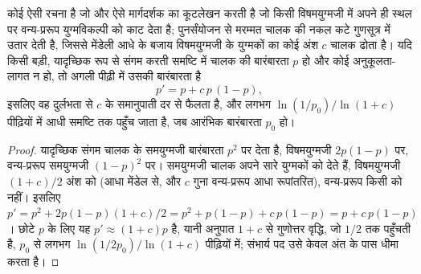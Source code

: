 \begin{theorem}[किसी जीन-चालक का अति-मेंडेली फैलाव]\label{thm:b3:genetic-engineering:drive}
कोई \emph{} ऐसी रचना है जो  और ऐसे मार्गदर्शक का कूटलेखन
करती है जो किसी विषमयुग्मजी में अपने ही स्थल पर वन्य-प्ररूप
युग्मविकल्पी को काट देता है; पुनर्संयोजन से मरम्मत चालक की नकल कटे
गुणसूत्र में उतार देती है, जिससे मेंडेली आधे के बजाय विषमयुग्मजी के
युग्मकों का कोई अंश $c$ चालक ढोता है। यदि किसी बड़ी, यादृच्छिक रूप से
संगम करती समष्टि में चालक की बारंबारता $p$ हो और कोई अनुकूलता-लागत न
हो, तो अगली पीढ़ी में उसकी बारंबारता है
\[
p' = p + c\,p\,(1 - p),
\]
इसलिए वह दुर्लभता से $c$ के समानुपाती दर से फैलता है, और लगभग
$\ln(1/p_{0})/\ln(1 + c)$ पीढ़ियों में आधी समष्टि तक पहुँच जाता है,
जब आरंभिक बारंबारता $p_{0}$ हो।
\end{theorem}
\begin{proof}
यादृच्छिक संगम चालक के समयुग्मजी बारंबारता $p^{2}$ पर देता है,
विषमयुग्मजी $2p(1-p)$ पर, वन्य-प्ररूप समयुग्मजी $(1-p)^{2}$ पर।
समयुग्मजी चालक अपने सारे युग्मकों को देते हैं, विषमयुग्मजी
$(1 + c)/2$ अंश को (आधा मेंडेल से, और $c$ गुना वन्य-प्ररूप आधा
रूपांतरित), वन्य-प्ररूप किसी को नहीं। इसलिए $p' = p^{2} + 2p(1-p)(1+c)/2
= p^{2} + p(1-p) + c\,p(1-p) = p + c\,p(1-p)$। छोटे $p$ के लिए यह
$p' \approx (1+c)p$ है, यानी अनुपात $1 + c$ से गुणोत्तर वृद्धि, जो
$1/2$ तक पहुँचती है, $p_{0}$ से लगभग $\ln(1/2p_{0})/\ln(1+c)$ पीढ़ियों
में; संभार्य पद उसे केवल अंत के पास धीमा करता है।
\end{proof}


